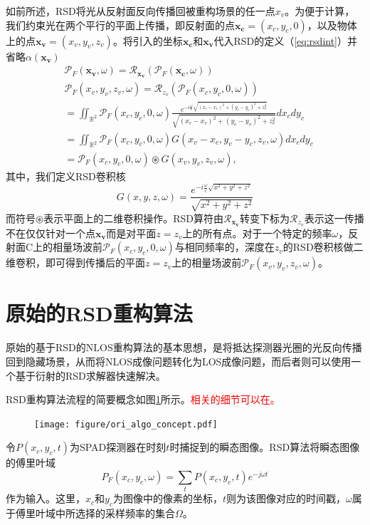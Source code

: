 \documentclass[master]{shtthesis}             %
\begin{document}
如前所述，RSD将光从反射面反向传播回被重构场景的任一点$x_v$。为便于计算，我们约束光在两个平行的平面上传播，即反射面的点$\mathbf{x_c}=(x_c,y_c,0)$，以及物体上的点$\mathbf{x_v}=(x_v,y_v,z_v)$。将引入的坐标$\mathbf{x_c}$和$\mathbf{x_v}$代入RSD的定义（\ref{eq:rsdint}）并省略$\alpha(\mathbf{x_v})$
\begin{equation}
  \begin{split}
    &\mathcal{P}_F(\mathbf{x_v},\omega) = \mathcal{R}_{\mathbf{x_v}}\left( \mathcal{P}_F(\mathbf{x_c},\omega) \right) \\
    &\mathcal{P}_F(x_v,y_v,z_v,\omega) = \mathcal{R}_{z_v}\left( \mathcal{P}_F(x_c,y_c,0,\omega) \right)\\
    &= \iint_{\mathbb{R}^2}\mathcal{P}_F(x_c,y_c,0,\omega)\frac{e^{-i\frac{\omega}{c}\sqrt{(x_c-x_v)^2+(y_c-y_v)^2+z_v^2}}}{\sqrt{(x_c-x_v)^2+(y_c-y_v)^2+z_v^2}} dx_cdy_c \\
    &= \iint_{\mathbb{R}^2}\mathcal{P}_F(x_c,y_c,0,\omega) G(x_v-x_c,y_v-y_c,z_v,\omega) dx_cdy_c \\
    &= \mathcal{P}_F(x_c,y_c,0,\omega) \circledast G(x_v,y_v,z_v,\omega),
  \end{split}
\end{equation}
其中，我们定义RSD卷积核
\begin{equation}
  G(x,y,z,\omega) = \frac{e^{-i\frac{\omega}{c}\sqrt{x^2+y^2+z^2}}}{\sqrt{x^2+y^2+z^2}}
\end{equation}
而符号$\circledast$表示平面上的二维卷积操作。RSD算符由$\mathcal{R}_{\mathbf{x_v}}$转变下标为$\mathcal{R}_{z_v}$表示这一传播不在仅仅针对一个点$\mathbf{x_v}$而是对平面$z=z_v$上的所有点。对于一个特定的频率$\omega$，反射面C上的相量场波前$\mathcal{P}_F(x_c,y_c,0,\omega)$与相同频率的，深度在$z_v$的RSD卷积核做二维卷积，即可得到传播后的平面$z=z_v$上的相量场波前$\mathcal{P}_F(x_v,y_v,z_v,\omega)$。

\section{原始的RSD重构算法}

原始的基于RSD的NLOS重构算法的基本思想，是将抵达探测器光圈的光反向传播回到隐藏场景，从而将NLOS成像问题转化为LOS成像问题，而后者则可以使用一个基于衍射的RSD求解器快速解决\citep{Liu}。

RSD重构算法流程的简要概念如图\ref{fig:ori_algo_concept}所示。\textcolor{red}{相关的细节可以在\citep{Liu,Liu2019}。}
\begin{figure}[htbp]
  \centering
  \texttt{[image: figure/ori\_algo\_concept.pdf]}
  \label{fig:ori_algo_concept}
\end{figure}
令$P(x_c,y_c,t)$为SPAD探测器在时刻$t$时捕捉到的瞬态图像。RSD算法将瞬态图像的傅里叶域
\begin{equation}
  P_F(x_c,y_c,\omega) = \sum_t P(x_c,y_c,t)e^{-j\omega t}
\end{equation}
作为输入。这里，$x_c$和$y_c$为图像中的像素的坐标，$t$则为该图像对应的时间戳，$\omega$属于傅里叶域中所选择的采样频率的集合$\Omega$。
\end{document}
